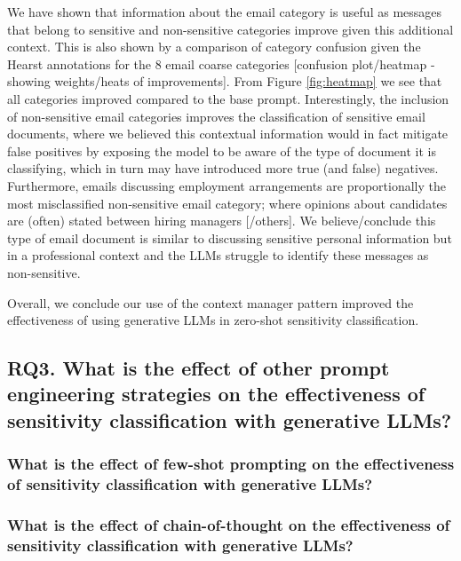 We have shown that information about the email category is useful as messages that belong to sensitive and non-sensitive categories improve given this additional context. This is also shown by a comparison of category confusion given the Hearst annotations for the 8 email coarse categories [confusion plot/heatmap - showing weights/heats of improvements]. From Figure \ref{fig:heatmap} we see that all categories improved compared to the base prompt. Interestingly, the inclusion of non-sensitive email categories improves the classification of sensitive email documents, where we believed this contextual information would in fact mitigate false positives by exposing the model to be aware of the type of document it is classifying, which in turn may have introduced more true (and false) negatives. Furthermore, emails discussing employment arrangements are proportionally the most misclassified non-sensitive email category; where opinions about candidates are (often) stated between hiring managers [/others]. We believe/conclude this type of email document is similar to discussing sensitive personal information but in a professional context and the LLMs struggle to identify these messages as non-sensitive.

Overall, we conclude our use of the context manager pattern improved the effectiveness of using generative LLMs in zero-shot sensitivity classification.

\subsection{RQ3. What is the effect of other prompt engineering strategies on the effectiveness of sensitivity classification with generative LLMs?}
\subsubsection{What is the effect of few-shot prompting on the effectiveness of sensitivity classification with generative LLMs?}

\subsubsection{What is the effect of chain-of-thought on the effectiveness of sensitivity classification with generative LLMs?}
